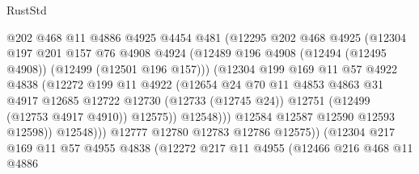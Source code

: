 \begin{lexlean}{RustStd}
\begin{coremodule}
                          @202
                          @468
                          @11
                          @4886
                          @4925
                          @4454
                          @481
                          (@12295
                            @202
                            @468
                            @4925
                            (@12304
                              @197
                              @201
                              @157
                              @76
                              @4908
                              @4924
                              (@12489
                                @196
                                @4908
                                (@12494 (@12495 @4908))
                                (@12499 (@12501 @196 @157)))
                              (@12304
                                @199
                                @169
                                @11
                                @57
                                @4922
                                @4838
                                (@12272
                                  @199
                                  @11
                                  @4922
                                  (@12654
                                    @24
                                    @70
                                    @11
                                    @4853
                                    @4863
                                    @31
                                    @4917
                                    @12685
                                    @12722
                                    @12730
                                    (@12733 (@12745 @24))
                                    @12751
                                    (@12499 (@12753 @4917 @4910))
                                    @12575))
                                @12548)))
                          @12584
                          @12587
                          @12590
                          @12593
                          @12598))
                      @12548)))
                @12777
                @12780
                @12783
                @12786
                @12575))
            (@12304
              @217
              @169
              @11
              @57
              @4955
              @4838
              (@12272
                @217
                @11
                @4955
                (@12466
                  @216
                  @468
                  @11
                  @4886

\end{coremodule}
\end{lexlean}
